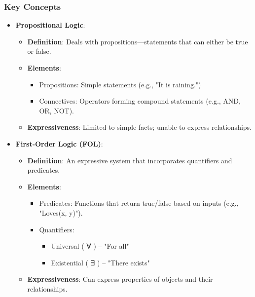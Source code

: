 \documentclass[aspectratio=169]{beamer}
\begin{document}
\begin{frame}[fragile]
    \frametitle{Key Concepts}
    \begin{itemize}
        \item \textbf{Propositional Logic}:
        \begin{itemize}
            \item \textbf{Definition}: Deals with propositions—statements that can either be true or false.
            \item \textbf{Elements}:
            \begin{itemize}
                \item Propositions: Simple statements (e.g., "It is raining.")
                \item Connectives: Operators forming compound statements (e.g., AND, OR, NOT).
            \end{itemize}
            \item \textbf{Expressiveness}: Limited to simple facts; unable to express relationships.
        \end{itemize}

        \item \textbf{First-Order Logic (FOL)}:
        \begin{itemize}
            \item \textbf{Definition}: An expressive system that incorporates quantifiers and predicates.
            \item \textbf{Elements}:
            \begin{itemize}
                \item Predicates: Functions that return true/false based on inputs (e.g., "Loves(x, y)").
                \item Quantifiers: 
                \begin{itemize}
                    \item Universal ( ∀ ) – "For all"
                    \item Existential ( ∃ ) – "There exists"
                \end{itemize}
            \end{itemize}
            \item \textbf{Expressiveness}: Can express properties of objects and their relationships.
        \end{itemize}
    \end{itemize}
\end{frame}
\end{document}
